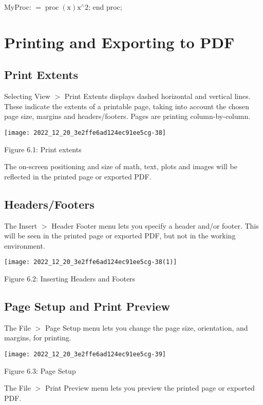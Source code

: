 MyProc: $=\operatorname{proc}(\mathrm{x}) \mathrm{x}^{\wedge} 2$; end proc;

\section{Printing and Exporting to PDF}
\subsection{Print Extents}
Selecting View $>$ Print Extents displays dashed horizontal and vertical lines. These indicate the extents of a printable page, taking into account the chosen page size, margins and headers/footers. Pages are printing column-by-column.

\begin{center}
\texttt{[image: 2022\_12\_20\_3e2ffe6ad124ec91ee5cg-38]}
\end{center}

Figure 6.1: Print extents

The on-screen positioning and size of math, text, plots and images will be reflected in the printed page or exported PDF.

\subsection{Headers/Footers}
The Insert $>$ Header Footer menu lets you specify a header and/or footer. This will be seen in the printed page or exported PDF, but not in the working environment.

\begin{center}
\texttt{[image: 2022\_12\_20\_3e2ffe6ad124ec91ee5cg-38(1)]}
\end{center}

Figure 6.2: Inserting Headers and Footers

\subsection{Page Setup and Print Preview}
The File $>$ Page Setup menu lets you change the page size, orientation, and margins, for printing.

\begin{center}
\texttt{[image: 2022\_12\_20\_3e2ffe6ad124ec91ee5cg-39]}
\end{center}

Figure 6.3: Page Setup

The File $>$ Print Preview menu lets you preview the printed page or exported PDF.


